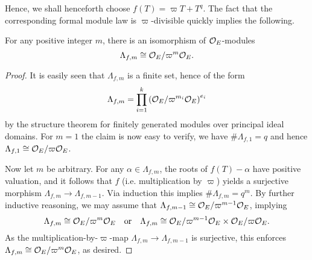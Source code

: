 \documentclass[../main.tex]{subfiles}
\begin{document}
Hence, we shall henceforth choose $f(T) = \varpi T + T^q$. 
The fact that the corresponding formal module law is $\varpi$-divisible quickly 
implies the following.
\begin{lem}\label{lem:StructureOfLambdamf}
  For any positive integer $m$, there is an isomorphism of $\mathcal{O}_E$-modules
  \begin{equation*}
    \Lambda_{f,m} \cong \mathcal{O}_E/\varpi^m\mathcal{O}_E.
  \end{equation*}
\begin{proof}
  It is easily seen that $\Lambda_{f,m}$ is a finite set, hence of the form
  \begin{equation*}
    \Lambda_{f,m} = \prod_{i = 1}^k \left(\mathcal{O}_E/\varpi^{m_i} \mathcal{O}_E \right)^{e_i}
  \end{equation*}
  by the structure theorem for finitely generated modules over principal ideal domains.
  For $m=1$ the claim is now easy to verify, we have $\# \Lambda_{f,1} = q$ and 
  hence $\Lambda_{f,1} \cong \mathcal{O}_E/\varpi\mathcal{O}_E$.

  Now let $m$ be arbitrary. For any $\alpha \in \Lambda_{f,m}$, the roots of
  $f(T) - \alpha$ have positive valuation, and it follows that $f$ (i.e. multiplication
  by $\varpi$) yields a
  surjective morphism $\Lambda_{f,m} \to \Lambda_{f,m-1}$. Via induction this
  implies $\# \Lambda_{f,m} = q^m$.
  By further inductive reasoning, we may assume that 
  $\Lambda_{f,m-1} \cong \mathcal{O}_E/\varpi^{m-1}\mathcal{O}_E$,  implying
  \begin{equation*}
    \Lambda_{f,m} \cong \mathcal{O}_E/\varpi^{m}\mathcal{O}_E \quad \text{or} \quad 
    \Lambda_{f,m} \cong \mathcal{O}_E/\varpi^{m-1}\mathcal{O}_E \times \mathcal{O}_E/\varpi \mathcal{O}_E.
  \end{equation*}
  As the multiplication-by-$\varpi$-map $\Lambda_{f,m} \to \Lambda_{f,m-1}$ is
  surjective, this enforces $\Lambda_{f,m} \cong \mathcal{O}_E/\varpi^m\mathcal{O}_E$, as desired.
\end{proof}
\end{lem}
\end{document}
